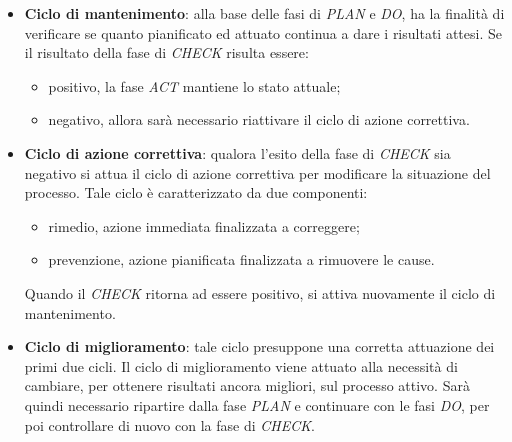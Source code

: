 \begin{itemize}
	\item \textbf{Ciclo di mantenimento}: alla base delle fasi di \textit{PLAN} e \textit{DO}, ha la finalità di verificare se quanto pianificato ed attuato continua a dare i risultati attesi. Se il risultato della fase di \textit{CHECK} risulta essere:
	\begin{itemize}
		\item positivo, la fase \textit{ACT} mantiene lo stato attuale;
		\item negativo, allora sarà necessario riattivare il ciclo di azione correttiva.
	\end{itemize}
	\item \textbf{Ciclo di azione correttiva}: qualora l’esito della fase di \textit{CHECK} sia negativo si attua il ciclo di azione correttiva per modificare la situazione del processo. Tale ciclo è caratterizzato da due componenti:
	\begin{itemize}
		\item rimedio, azione immediata finalizzata a correggere;
		\item prevenzione, azione pianificata finalizzata a rimuovere le cause.
	\end{itemize}
	Quando il \textit{CHECK} ritorna ad essere positivo, si attiva nuovamente il ciclo di mantenimento.
	\item \textbf{Ciclo di miglioramento}: tale ciclo presuppone una corretta attuazione dei primi due cicli. Il ciclo di miglioramento viene attuato alla necessità di cambiare, per ottenere risultati ancora migliori,  sul processo attivo. Sarà quindi necessario ripartire dalla fase \textit{PLAN} e continuare con le fasi \textit{DO}, per poi controllare di nuovo con la fase di \textit{CHECK}.
\end{itemize}
\clearpage
